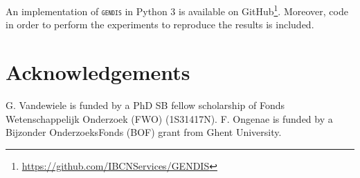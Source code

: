 \documentclass[runningheads]{llncs}
\begin{document}
An implementation of \textsc{\texttt{gendis}} in Python 3 is available on GitHub\footnote{\url{https://github.com/IBCNServices/GENDIS}}. Moreover, code in order to perform the experiments to reproduce the results is included.

\section{Acknowledgements}\label{sec:acknowledgements}

G. Vandewiele is funded by a PhD SB fellow scholarship of Fonds Wetenschappelijk Onderzoek (FWO) (1S31417N). F. Ongenae is funded by a Bijzonder OnderzoeksFonds (BOF) grant from Ghent University.

\small



\end{document}
